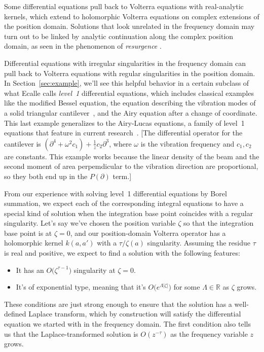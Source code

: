 \documentclass{article}
\theoremstyle{definition}
\theoremstyle{plain}
\newcommand{\R}{\mathbb{R}}
\newenvironment{verify}{\color{ForestGreen}}{\color{black}}
\begin{document}
Some differential equations pull back to Volterra equations with real-analytic kernels, which extend to holomorphic Volterra equations on complex extensions of the position domain. Solutions that look unrelated in the frequency domain may turn out to be linked by analytic continuation along the complex position domain, as seen in the phenomenon of {\em resurgence} \cite{EcalleIII}\cite{lectures-marino}\cite[Section 2.4]{sternin1995borel}.

Differential equations with irregular singularities in the frequency domain can pull back to Volterra equations with regular singularities in the position domain. In Section~\ref{sec:example}, we'll see this helpful behavior in a certain subclass of what Ecalle calls {\em level~1} differential equations, which includes classical examples like the modified Bessel equation, the equation describing the vibration modes of a solid triangular cantilever~\cite[from Equation~12.58]{genta2009vibration}, and the Airy equation after a change of coordinate. This last example generalizes to the Airy-Lucas equations, a family of level~1 equations that feature in current research~\cite[Equations 3.2]{charbonnier22}.
\begin{verify}
[The differential operator for the cantilever is $(\partial^4 + \omega^2 c_1) + \tfrac{1}{z} c_2 \partial^3$, where $\omega$ is the vibration frequency and $c_1, c_2$ are constants. This example works because the linear density of the beam and the second moment of area perpemdicular to the vibration direction are proportional, so they both end up in the $P(\partial)$ term.]\end{verify}

From our experience with solving level~1 differential equations by Borel summation, we expect each of the corresponding integral equations to have a special kind of solution when the integration base point coincides with a regular singularity. Let's say we've chosen the position variable $\zeta$ so that the integration base point is at $\zeta = 0$, and our position-domain Volterra operator has a holomorphic kernel $k(a, a')$ with a $\tau/\zeta(a)$ singularity. Assuming the residue $\tau$ is real and positive, we expect to find a solution with the following features:
\begin{itemize}
\item It has an $O\big(\zeta^{\tau-1}\big)$ singularity at $\zeta = 0$.
\item It's of exponential type, meaning that it's $O\big(e^{\Lambda|\zeta|}\big)$ for some $\Lambda \in \R$ as $\zeta$ grows.
\end{itemize}
These conditions are just strong enough to ensure that the solution has a well-defined Laplace transform, which by construction will satisfy the differential equation we started with in the frequency domain. The first condition also tells us that the Laplace-transformed solution is $O(z^{-\tau})$ as the frequency variable $z$ grows.
\end{document}
